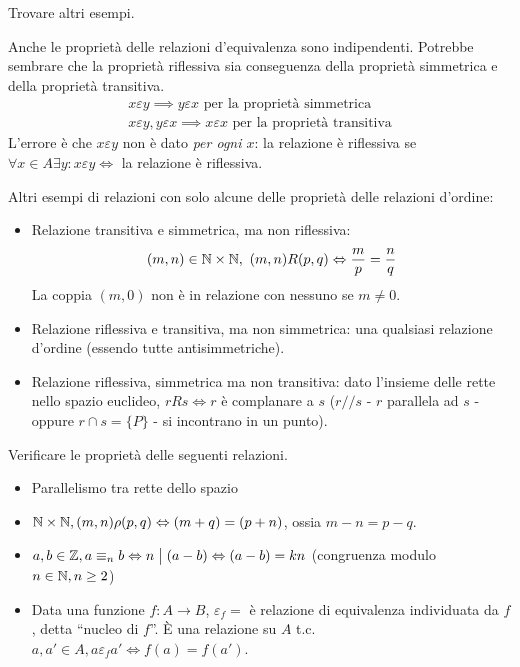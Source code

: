 \begin{esercizio}
Trovare altri esempi.

\vspace{5cm}
\end{esercizio}

Anche le propriet\`a delle relazioni d'equivalenza sono indipendenti. Potrebbe sembrare che la propriet\`a riflessiva sia conseguenza della propriet\`a simmetrica e della propriet\`a transitiva.
\begin{gather*}
x \varepsilon y \implies y \varepsilon x \text{ per la propriet\`a simmetrica} \\
x \varepsilon y , y \varepsilon x \implies x \varepsilon x \text{ per la propriet\`a transitiva}
\end{gather*}
L'errore \`e che $x \varepsilon y$ non \`e dato \textit{per ogni $x$}: la relazione \`e riflessiva se $\forall x \in A \exists y : x \varepsilon y \iff $ la relazione \`e riflessiva.

Altri esempi di relazioni con solo alcune delle propriet\`a delle relazioni d'ordine:
\begin{itemize}
  \item Relazione transitiva e simmetrica, ma non riflessiva:
  \[
  (m, n) \in \mathbb{N} \times \mathbb{N}, \ (m,n) R (p, q) \Leftrightarrow \frac{m}{p} = \frac{n}{q}
  \]
  La coppia $(m,0)$ non \`e in relazione con nessuno se $m \neq 0$.
  \item Relazione riflessiva e transitiva, ma non simmetrica: una qualsiasi relazione d'ordine (essendo tutte antisimmetriche).
  \item Relazione riflessiva, simmetrica ma non transitiva: dato l'insieme delle rette nello spazio euclideo, $r R s \iff r $ \`e complanare a $s$ ($r // s$ - $r$ parallela ad $s$ - oppure $r \cap s = \{ P \}$ - si incontrano in un punto).
\end{itemize}

\begin{esercizio}
Verificare le propriet\`a delle seguenti relazioni.
\begin{itemize}
  \item Parallelismo tra rette dello spazio \vspace{3cm}
  \item $\mathbb{N} \times \mathbb{N}, (m, n) \rho (p, q) \Leftrightarrow (m + q) = (p + n)$, ossia $m - n = p - q$. \vspace{3cm}
  \item $a, b \in \mathbb{Z}, a \equiv_n b \Leftrightarrow n \bigm| (a - b) \Leftrightarrow (a-b) = k n$ (congruenza modulo $n \in \mathbb{N}, n \ge 2$) \vspace{3cm}
  \item Data una funzione $f: A \to B $, $ \varepsilon_f = $ \`e relazione di equivalenza individuata da $f$, detta ``nucleo di $f$''. \`E una relazione su $A$ t.c. $a, a' \in A, a \varepsilon_f a' \iff f(a) = f(a')$. \vspace{3cm}
\end{itemize}
\end{esercizio}

